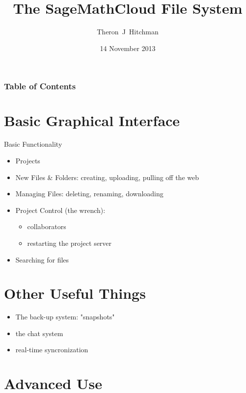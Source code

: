 \documentclass{beamer}
\begin{document}
\title[SMC File System]{The SageMathCloud File System}
\author{Theron~J~Hitchman}

\date[Augustana Workshop]{14 November 2013}

\frame{\titlepage}

\begin{frame}
\frametitle{Table of Contents}
\tableofcontents
\end{frame}

\section{Basic Graphical Interface}
\begin{frame}{Basic Functionality}
\begin{itemize}
\item Projects
\item New Files \& Folders: creating, uploading, pulling off the web
\item Managing Files: deleting, renaming, downloading
\item Project Control (the wrench):
    \begin{itemize}
    \item collaborators
    \item restarting the project server
    \end{itemize}
\item Searching for files
\end{itemize}
\end{frame}

\section{Other Useful Things}

\begin{frame}
\begin{itemize}
\item The back-up system: "snapshots"
\item the chat system
\item real-time syncronization
\end{itemize}
\end{frame}

\section{Advanced Use}
\end{document}
